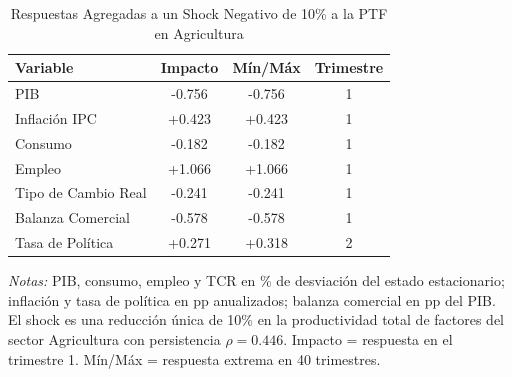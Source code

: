 \begin{table}[htbp]
\centering
\caption{Respuestas Agregadas a un Shock Negativo de 10\% a la PTF en Agricultura}
\label{tab:agr_agg}
\begin{threeparttable}
\begin{tabular}{@{}l c c c@{}}
\toprule
Variable & Impacto & Mín/Máx & Trimestre \\
\midrule
PIB & -0.756 & -0.756 & 1 \\
Inflación IPC & +0.423 & +0.423 & 1 \\
Consumo & -0.182 & -0.182 & 1 \\
Empleo & +1.066 & +1.066 & 1 \\
Tipo de Cambio Real & -0.241 & -0.241 & 1 \\
Balanza Comercial & -0.578 & -0.578 & 1 \\
Tasa de Política & +0.271 & +0.318 & 2 \\
\bottomrule
\end{tabular}
\begin{tablenotes}[flushleft]
\footnotesize
\item \textit{Notas:} PIB, consumo, empleo y TCR en \% de desviación del estado estacionario; inflación y tasa de política en pp anualizados; balanza comercial en pp del PIB. El shock es una reducción única de 10\% en la productividad total de factores del sector Agricultura con persistencia $\rho = 0.446$. Impacto = respuesta en el trimestre 1. Mín/Máx = respuesta extrema en 40 trimestres.
\end{tablenotes}
\end{threeparttable}
\end{table}
